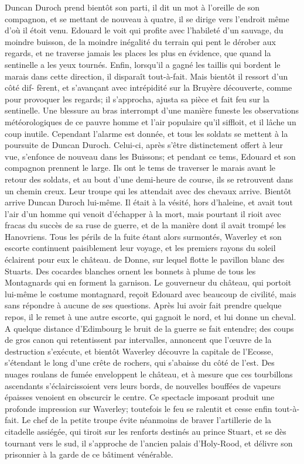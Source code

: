 Duncan Duroch prend bientôt son parti, il dit un mot à l'oreille de son compagnon, et se mettant de nouveau à quatre, il se dirige vers l'endroit même d'où il étoit venu. Edouard le voit qui profite avec l'habileté d'un sauvage, du moindre buisson, de la moindre inégalité du terrain qui pent le dérober aux regards, et ne traverse jamais les places les plus en évidence, que quand la sentinelle a les yeux tournés. Enfin, lorsqu'il a gagné les taillis qui bordent le marais dans cette direction, il disparaît tout-à-fait. Mais bientôt il ressort d'un côté dif-\setcounter{page}{223} fèrent, et s'avançant avec intrépidité sur la Bruyère découverte, comme pour provoquer les regards; il s'approcha, ajusta sa pièce et fait feu sur la sentinelle. Une blessure au bras interrompt d'une manière funeste les observations météorologiques de ce pauvre homme et l'air populaire qu'il siffloit, et il lâche un coup inutile. Cependant l'alarme est donnée, et tous les soldats se mettent à la poursuite de Duncan Duroch. Celui-ci, après s'être distinctement offert à leur vue, s'enfonce de nouveau dans les Buissons; et pendant ce tems, Edouard et son compagnon prennent le large. Ils ont le tems de traverser le marais avant le retour des soldats, et au bout d'une demi-heure de course, ils se retrouvent dans un chemin creux. Leur troupe qui les attendait avec des chevaux arrive. Bientôt arrive Duncan Duroch lui-même. Il était à la vésité, hors d'haleine, et avait tout l'air d'un homme qui venoit d'échapper à la mort, mais pourtant il rioit avec fracas du succès de sa ruse de guerre, et de la manière dont il avait trompé les Hanovriens.
Tous les périls de la fuite étant alors surmontés, Waverley et son escorte continuent paisiblement leur voyage, et les premiers rayons du soleil éclairent pour eux le château.\setcounter{page}{224} de Donne, sur lequel flotte le pavillon blanc des Stuarts. Des cocardes blanches ornent les bonnets à plume de tous les Montagnards qui en forment la garnison. Le gouverneur du château, qui portoit lui-même le costume montagnard, reçoit Edouard avec beaucoup de civilité, mais sans répondre à aucune de ses questions.
Après lui avoir fait prendre quelque repos, il le remet à une autre escorte, qui gagnoit le nord, et lui donne un cheval. A quelque distance d'Edimbourg le bruit de la guerre se fait entendre; des coups de gros canon qui retentissent par intervalles, annoncent que l'œuvre de la destruction s'exécute, et bientôt Waverley découvre la capitale de l'Ecosse, s'étendant le long d'une crête de rochers, qui s'abaisse du côté de l'est. Des nuages roulans de fumée enveloppent le château, et à mesure que ces tourbillons ascendants s'éclaircissoient vers leurs bords, de nouvelles bouffées de vapeurs épaisses venoient en obscurcir le centre. Ce spectacle imposant produit une profonde impression sur Waverley; toutefois le feu se ralentit et cesse enfin tout-à-fait. Le chef de la petite troupe évite néanmoins de braver l'artillerie de la citadelle assiégée, qui tiroit sur les renforts destinés au prince Stuart, et se dès\setcounter{page}{225} tournant vers le sud, il s'approche de l'ancien palais d'Holy-Rood, et délivre son prisonnier à la garde de ce bâtiment vénérable.
